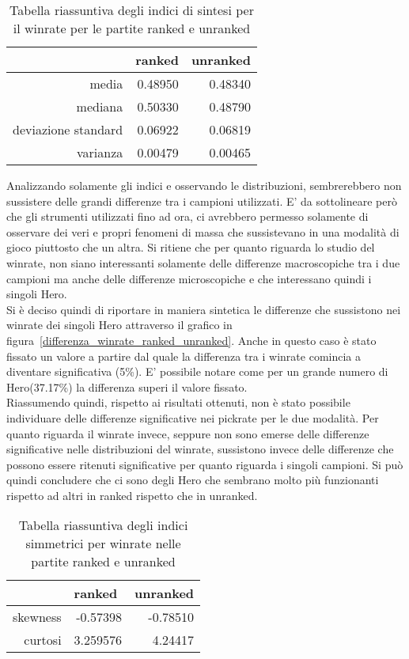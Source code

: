 \begin{table}
\centering
\caption{Tabella riassuntiva degli indici di sintesi per il winrate per le partite ranked e unranked}
\label{indici_sintesi_winrate}
\begin{tabular}{|r|r|r|}
\hline
\multicolumn{1}{|l|}{} & \multicolumn{1}{l|}{ranked} & \multicolumn{1}{l|}{unranked} \\ \hline
media               &  0.48950  &  0.48340 \\ \hline
mediana             &  0.50330  &  0.48790 \\ \hline
deviazione standard &  0.06922  &  0.06819 \\ \hline
varianza            &  0.00479  &  0.00465 \\ \hline
\end{tabular}
\end{table}
Analizzando solamente gli indici e osservando le distribuzioni, sembrerebbero non sussistere delle grandi differenze tra i campioni utilizzati. E' da sottolineare però che gli strumenti utilizzati fino ad ora, ci avrebbero permesso solamente di osservare dei veri e propri fenomeni di massa che sussistevano in una modalità di gioco piuttosto che un altra. Si ritiene che per quanto riguarda lo studio del winrate, non siano interessanti solamente delle differenze macroscopiche tra i due campioni ma anche delle differenze microscopiche e che interessano quindi i singoli Hero. \\
Si è deciso quindi di riportare in maniera sintetica le differenze che sussistono nei winrate dei singoli Hero attraverso il grafico in figura~\ref{differenza_winrate_ranked_unranked}. Anche in questo caso è stato fissato un valore a partire dal quale la differenza tra i winrate comincia a diventare significativa (5\%). E' possibile notare come per un grande numero di Hero(37.17\%) la differenza superi il valore fissato. \\
Riassumendo quindi, rispetto ai risultati ottenuti, non è stato possibile individuare delle differenze significative nei pickrate per le due modalità. Per quanto riguarda il winrate invece, seppure non sono emerse delle differenze significative nelle distribuzioni del winrate, sussistono invece delle differenze che possono essere ritenuti significative per quanto riguarda i singoli campioni. Si può quindi concludere che ci sono degli Hero che sembrano molto più funzionanti rispetto ad altri in ranked rispetto che in unranked.
\begin{table}
\centering
\caption{Tabella riassuntiva degli indici simmetrici per winrate nelle partite ranked e unranked}
\label{indici_simmetrici_winrate}
\begin{tabular}{|r|r|r|}
\hline
\multicolumn{1}{|l|}{} & \multicolumn{1}{l|}{ranked} & \multicolumn{1}{l|}{unranked} \\ \hline
skewness    &  -0.57398  &    -0.78510    \\ \hline
curtosi     &  3.259576  &    4.24417    \\ \hline
\end{tabular}
\end{table}
